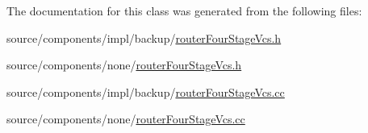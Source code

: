 The documentation for this class was generated from the following files:\begin{CompactItemize}
\item 
source/components/impl/backup/\hyperlink{impl_2backup_2routerFourStageVcs_8h}{routerFourStageVcs.h}\item 
source/components/none/\hyperlink{none_2routerFourStageVcs_8h}{routerFourStageVcs.h}\item 
source/components/impl/backup/\hyperlink{impl_2backup_2routerFourStageVcs_8cc}{routerFourStageVcs.cc}\item 
source/components/none/\hyperlink{none_2routerFourStageVcs_8cc}{routerFourStageVcs.cc}\end{CompactItemize}
